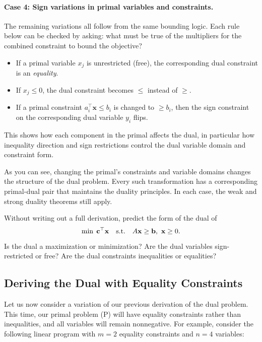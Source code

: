 \paragraph{Case 4: Sign variations in primal variables and constraints.}
The remaining variations all follow from the same bounding logic.  Each rule below can be checked by asking: what must be true of the multipliers for the combined constraint to bound the objective?

\begin{itemize}
  \item If a primal variable \( x_j \) is unrestricted (free), the corresponding dual constraint is an \emph{equality}.
  \item If \( x_j \leq 0 \), the dual constraint becomes \( \leq \) instead of \( \geq \).
  \item If a primal constraint \( a_i^\top \mathbf{x} \leq b_i \) is changed to \( \geq b_i \), then the sign constraint on the corresponding dual variable \( y_i \) flips.
\end{itemize}

This shows how each component in the primal affects the dual, in particular how inequality direction and sign restrictions control the dual variable domain and constraint form.

As you can see, changing the primal’s constraints and variable domains changes the structure of the dual problem. Every such transformation has a corresponding primal-dual pair that maintains the duality principles. In each case, the weak and strong duality theorems still apply.

\begin{learningcheckpoint}[label={lc:dual-forms}]
Without writing out a full derivation, predict the form of the dual of
\[
\min\; \mathbf{c}^\top \mathbf{x} \quad \text{s.t.}\quad A\mathbf{x} \geq \mathbf{b},\ \mathbf{x} \geq 0.
\]
Is the dual a maximization or minimization?  Are the dual variables sign-restricted or free?  Are the dual constraints inequalities or equalities?
\end{learningcheckpoint}

\subsection*{Deriving the Dual with Equality Constraints}

Let us now consider a variation of our previous derivation of the dual problem. This time, our primal problem (P) will have equality constraints rather than inequalities, and all variables will remain nonnegative. For example, consider the following linear program with $m=2$ equality constraints and $n=4$ variables:

